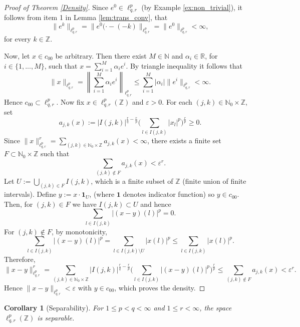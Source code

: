 \documentclass[preprint,12pt]{elsarticle}
\newtheorem{corollary}{Corollary}[theorem]
\begin{document}
\begin{proof}[Proof of Theorem \ref{Density}]
   Since $e^{0}\in \ell^{p}_{q,r}$ (by Example \ref{ex:non_trivial}), it follows from item 1 in Lemma \ref{lem:trans_conv}, that 
    \begin{equation*}
        \|e^{k}\|_{\ell^{p}_{q,r}}= \|e^{0}(\cdot-(-k)\|_{\ell^{p}_{q,r}}=\|e^{0}\|_{\ell^{p}_{q,r}}<\infty,
    \end{equation*}
for every $k\in \mathbb{Z}$.

Now, let $x\in c_{00}$ be arbitrary. Then there exist $M\in \mathbb{N}$ and $\alpha_{i}\in \mathbb{R}$, for $i\in \{1,...,M\}$, such that $x=\sum_{i=1}^{M}\alpha_{i}e^{i}$. By triangle inequality it follows that
\begin{equation}
    \|x\|_{\ell^{p}_{q,r}}=\left\|\sum_{i=1}^{M}\alpha_{i}e^{i}\right\|_{\ell^{p}_{q,r}}\leq \sum_{i=1}^{M}|\alpha_{i}|\|e^{i}\|_{\ell^{p}_{q,r}}<\infty.
\end{equation}
Hence $c_{00}\subset \ell^{p}_{q,r}$. Now fix $x\in \ell^{p}_{q,r}(\mathbb{Z})$ and $\varepsilon>0$. For each $(j,k)\in \mathbb{N}_{0}\times \mathbb{Z}$, set
\[
a_{j,k}(x):=|I(j,k)|^{\frac{r}{q}-\frac{r}{p}}\Big(\sum_{l\in I(j,k)} |x_l|^p\Big)^{\frac{r}{p}}\ge 0.
\]
Since $\|x\|_{\ell^{p}_{q,r}}^r=\sum_{(j,k)\in \mathbb{N}_{0}\times\mathbb{Z}} a_{j,k}(x)<\infty$, there exists a finite set $F\subset \mathbb{N}_0\times\mathbb{Z}$ such that
\[
\sum_{(j,k)\notin F} a_{j,k}(x)<\varepsilon^r.
\]
Let $U:=\bigcup_{(j,k)\in F} I(j,k)$, which is a finite subset of $\mathbb{Z}$ (finite union of finite intervals). Define $y:=x\cdot \mathbf{1}_U$,  (where $\mathbf{1}$ denotes indicator function) so $y\in c_{00}$.
Then, for $(j,k)\in F$ we have $I(j,k)\subset U$ and hence
\[
\sum_{l\in I(j,k)} |(x-y)(l)|^p=0.
\]
For $(j,k)\notin F$, by monotonicity,
\[
\sum_{l\in I(j,k)} |(x-y)(l)|^p
=\sum_{l\in I(j,k)\setminus U} |x(l)|^p
\le \sum_{l\in I(j,k)} |x(l)|^p.
\]
Therefore,
\[
\|x-y\|_{\ell^{p}_{q,r}}^r
=\sum_{(j,k)\in \mathbb{N}_{0}\times\mathbb{Z}}|I(j,k)|^{\frac{r}{q}-\frac{r}{p}}
\Big(\sum_{l\in I(j,k)} |(x-y)(l)|^p\Big)^{\frac{r}{p}}
\le \sum_{(j,k)\notin F} a_{j,k}(x)
<\varepsilon^r.
\]
Hence $\|x-y\|_{\ell^{p}_{q,r}}<\varepsilon$ with $y\in c_{00}$, which proves the density.
\end{proof}
\begin{corollary}[Separability]
For $1 \le p < q < \infty$ and $1 \le r < \infty$, the space $\ell^p_{q,r}(\mathbb Z)$ is separable.
\end{corollary}
\end{document}
